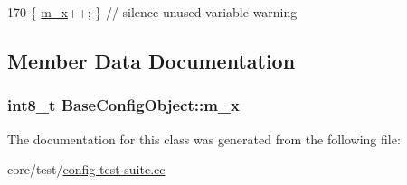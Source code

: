 \begin{DoxyCode}
170 \{ \hyperlink{classBaseConfigObject_af8fce994135a069718981bd147d564b3}{m\_x}++; \} \textcolor{comment}{// silence unused variable warning}
\end{DoxyCode}


\subsection{Member Data Documentation}
\subsubsection[{\texorpdfstring{m\+\_\+x}{m_x}}]{\setlength{\rightskip}{0pt plus 5cm}int8\+\_\+t Base\+Config\+Object\+::m\+\_\+x\hspace{0.3cm}{\ttfamily [private]}}\hypertarget{classBaseConfigObject_af8fce994135a069718981bd147d564b3}{}\label{classBaseConfigObject_af8fce994135a069718981bd147d564b3}


The documentation for this class was generated from the following file\+:\begin{DoxyCompactItemize}
\item 
core/test/\hyperlink{config-test-suite_8cc}{config-\/test-\/suite.\+cc}\end{DoxyCompactItemize}
